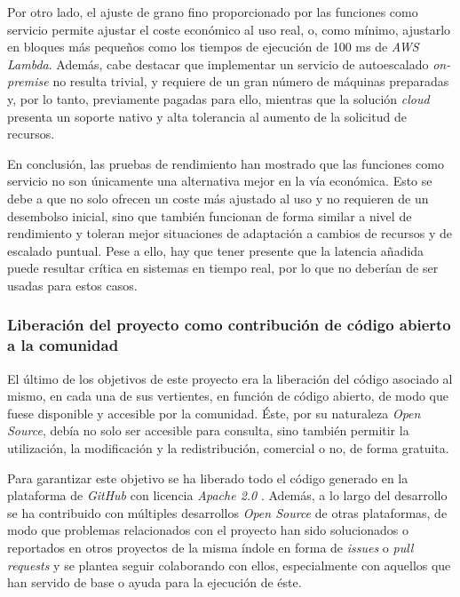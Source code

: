 \documentclass[11pt,spanish,listoffigures]{tfgetsinf}
\begin{document}
Por otro lado, el ajuste de grano fino proporcionado por las funciones como servicio permite ajustar el coste económico al uso real, o, como mínimo, ajustarlo en bloques más pequeños como los tiempos de ejecución de 100 ms de \textit{AWS Lambda}. Además, cabe destacar que implementar un servicio de \gls{autoescalado} \textit{on-premise} no resulta trivial, y requiere de un gran número de máquinas preparadas y, por lo tanto, previamente pagadas para ello, mientras que la solución \textit{cloud} presenta un soporte nativo y alta tolerancia al aumento de la solicitud de recursos.

En conclusión, las pruebas de rendimiento han mostrado que las funciones como servicio no son únicamente una alternativa mejor en la vía económica. Esto se debe a que no solo ofrecen un coste más ajustado al uso y no requieren de un desembolso inicial, sino que también funcionan de forma similar a nivel de rendimiento y toleran mejor situaciones de adaptación a cambios de recursos y de escalado puntual. Pese a ello, hay que tener presente que la latencia añadida puede resultar crítica en sistemas en tiempo real, por lo que no deberían de ser usadas para estos casos.


\subsubsection{Liberación del proyecto como contribución de código abierto a la comunidad }

El último de los objetivos de este proyecto era la liberación del código asociado al mismo, en cada una de sus vertientes, en función de código abierto, de modo que fuese disponible y accesible por la comunidad. Éste, por su naturaleza \textit{Open Source}, debía no solo ser accesible para consulta, sino también permitir la utilización, la modificación y la redistribución, comercial o no, de forma gratuita. 

Para garantizar este objetivo se ha liberado todo el código generado en la plataforma de \textit{
GitHub} \cite{ptolomeo} con licencia \textit{Apache 2.0} \cite{apache}. Además, a lo largo del desarrollo se ha contribuido con múltiples desarrollos \textit{Open Source} de otras plataformas, de modo que problemas relacionados con el proyecto han sido solucionados o reportados en otros proyectos de la misma índole en forma de \textit{issues} o \textit{pull requests} y se plantea seguir colaborando con ellos, especialmente con aquellos que han servido de base o ayuda para la ejecución de éste.
\end{document}
